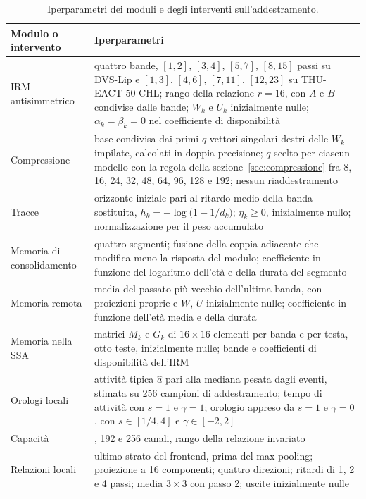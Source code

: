 \begin{table}[ht]
\centering
\small
\renewcommand{\arraystretch}{1.25}
\caption[Iperparametri dei moduli e degli interventi]{Iperparametri dei moduli e degli interventi sull'addestramento.}
\label{tab:iperparametri_moduli}
\begin{tabularx}{\textwidth}{@{}>{\raggedright\arraybackslash}p{3.5cm} >{\raggedright\arraybackslash}X@{}}
\hline
\textbf{Modulo o intervento} & \textbf{Iperparametri} \\
\hline
IRM antisimmetrico & quattro bande, $[1,2]$, $[3,4]$, $[5,7]$, $[8,15]$ passi su DVS-Lip e $[1,3]$, $[4,6]$, $[7,11]$, $[12,23]$ su THU-EACT-50-CHL; rango della relazione $r=16$, con $A$ e $B$ condivise dalle bande; $W_k$ e $U_k$ inizialmente nulle; $\alpha_k=\beta_k=0$ nel coefficiente di disponibilità \\
Compressione & base condivisa dai primi $q$ vettori singolari destri delle $W_k$ impilate, calcolati in doppia precisione; $q$ scelto per ciascun modello con la regola della sezione~\ref{sec:compressione} fra 8, 16, 24, 32, 48, 64, 96, 128 e 192; nessun riaddestramento \\
Tracce & orizzonte iniziale pari al ritardo medio della banda sostituita, $h_k=-\log\bigl(1-1/\bar d_k\bigr)$; $\eta_k\ge0$, inizialmente nullo; normalizzazione per il peso accumulato \\
Memoria di consolidamento & quattro segmenti; fusione della coppia adiacente che modifica meno la risposta del modulo; coefficiente in funzione del logaritmo dell'età e della durata del segmento \\
Memoria remota & media del passato più vecchio dell'ultima banda, con proiezioni proprie e $W$, $U$ inizialmente nulle; coefficiente in funzione dell'età media e della durata \\
Memoria nella SSA & matrici $M_k$ e $G_k$ di $16\times16$ elementi per banda e per testa, otto teste, inizialmente nulle; bande e coefficienti di disponibilità dell'IRM \\
Orologi locali & attività tipica $\hat a$ pari alla mediana pesata dagli eventi, stimata su 256 campioni di addestramento; tempo di attività con $s=1$ e $\gamma=1$; orologio appreso da $s=1$ e $\gamma=0$, con $s\in[1/4,4]$ e $\gamma\in[-2,2]$ \\
Capacità & 128, 192 e 256 canali, rango della relazione invariato \\
Relazioni locali & ultimo strato del frontend, prima del max-pooling; proiezione a 16 componenti; quattro direzioni; ritardi di 1, 2 e 4 passi; media $3\times3$ con passo 2; uscite inizialmente nulle \\

\end{tabularx}
\end{table}
